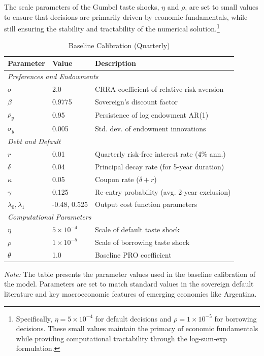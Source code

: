 \documentclass[12pt]{article}
\theoremstyle{plain}
\begin{document}
The scale parameters of the Gumbel taste shocks, $\eta$ and $\rho$, are set to
small values to ensure that decisions are primarily driven by economic
fundamentals, while still ensuring the stability and tractability of the
numerical solution.\footnote{Specifically, $\eta = 5 \times 10^{-4}$ for
	default decisions and $\rho = 1 \times 10^{-5}$ for borrowing decisions. These
	small values maintain the primacy of economic fundamentals while providing
	computational tractability through the log-sum-exp formulation.}

\begin{table}[h!]
	\centering
	\caption{Baseline Calibration (Quarterly)}
	\label{tab:calibration}
	\begin{tabular}{@{}lll@{}}
		\toprule
		Parameter              & Value              & Description                                  \\ \midrule
		\multicolumn{3}{l}{\textit{Preferences and Endowments}}                                    \\
		$\sigma$               & 2.0                & CRRA coefficient of relative risk aversion   \\
		$\beta$                & 0.9775             & Sovereign's discount factor                  \\
		$\rho_y$               & 0.95               & Persistence of log endowment AR(1)           \\
		$\sigma_y$             & 0.005              & Std. dev. of endowment innovations           \\
		\multicolumn{3}{l}{\textit{Debt and Default}}                                              \\
		$r$                    & 0.01               & Quarterly risk-free interest rate (4\% ann.) \\
		$\delta$               & 0.04               & Principal decay rate (for 5-year duration)   \\
		$\kappa$               & 0.05               & Coupon rate ($\delta+r$)                     \\
		$\gamma$               & 0.125              & Re-entry probability (avg. 2-year exclusion) \\
		$\lambda_0, \lambda_1$ & -0.48, 0.525       & Output cost function parameters              \\
		\multicolumn{3}{l}{\textit{Computational Parameters}}                                      \\
		$\eta$                 & $5 \times 10^{-4}$ & Scale of default taste shock                 \\
		$\rho$                 & $1 \times 10^{-5}$ & Scale of borrowing taste shock               \\
		$\theta$               & 1.0                & Baseline PRO coefficient                     \\ \bottomrule
	\end{tabular}
	\parbox{\linewidth}{\small\textit{Note:} The table presents the parameter values used in the baseline calibration of the model. Parameters are set to match standard values in the sovereign default literature and key macroeconomic features of emerging economies like Argentina.}


\end{table}
\end{document}
